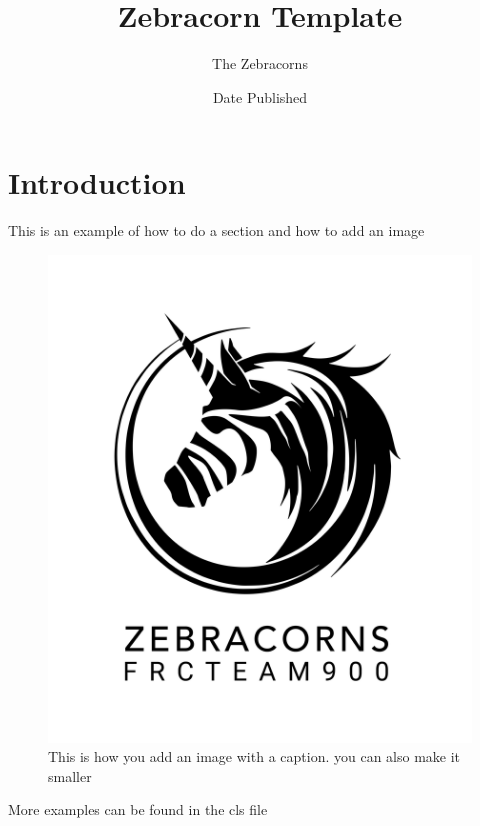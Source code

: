 \documentclass{zebracorns}
\title{Zebracorn Template}
\author{The Zebracorns}
\date{Date Published}
\begin{document}
  \maketitle

  \section{Introduction}
  \label{intro}
  This is an example of how to do a section and how to add an image

  \begin{figure}[H] %
    \centering %
    \includegraphics[width=.5\linewidth]{Logo-Stacked-Mono.png} %
    \caption{This is how you add an image with a caption. you can also make it smaller}
    \label{Zebracorn Logo} %
  \end{figure}
  
  More examples can be found in the cls file
\end{document}
